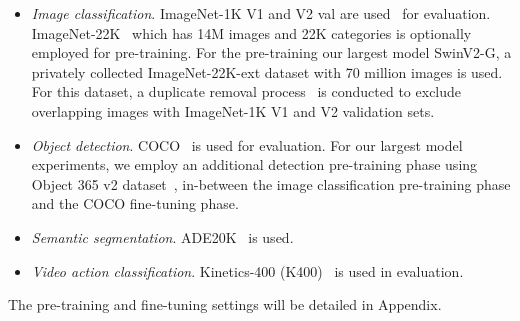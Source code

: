 \documentclass[10pt,twocolumn,letterpaper]{article}
\begin{document}
\begin{itemize}
    \item \emph{Image classification}. ImageNet-1K V1 and V2 val are used~\cite{deng2009imagenet,recht2019imagenet} for evaluation. ImageNet-22K~\cite{deng2009imagenet} which has 14M images and 22K categories is optionally employed for pre-training.  For the pre-training our largest model SwinV2-G, a privately collected ImageNet-22K-ext dataset with 70 million images is used. For this dataset, a duplicate removal process~\cite{radford2021clip} is conducted to exclude overlapping images with ImageNet-1K V1 and V2 validation sets.
    \item \emph{Object detection}. COCO~\cite{lin2014coco} is used for evaluation. For our largest model experiments, we employ an additional detection pre-training phase using Object 365 v2 dataset~\cite{Shao_2019_ICCV}, in-between the image classification pre-training phase and the COCO fine-tuning phase.
    \item \emph{Semantic segmentation}. ADE20K~\cite{zhou2018semantic} is used.
    \item \emph{Video action classification}. Kinetics-400 (K400)~\cite{kay2017kinetics} is used in evaluation. 
\end{itemize}

The pre-training and fine-tuning settings will be detailed in Appendix.
\end{document}
